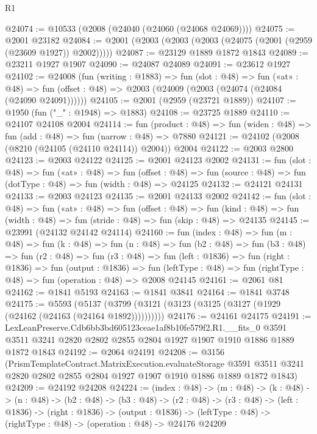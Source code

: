 \begin{lexlean}{R1}
\begin{coremodule}
@24074 := @10533 (@2008 (@24040 (@24060 (@24068 @24069))))
@24075 := @2001 @23182
@24084 := @2001 (@2003 (@2003 (@2003 (@24075 (@2001 (@2959 (@23609 @1927)) @2002)))))
@24087 := @23129 @1889 @1872 @1843
@24089 := @23211 @1927 @1907
@24090 := @24087 @24089
@24091 := @23612 @1927
@24102 := @24008
    (fun (writing : @1883) =>
    fun (slot : @48) =>
    fun («at» : @48) =>
    fun (offset : @48) => @2003 (@24009 (@2003 (@24074 (@24084 (@24090 @24091))))))
@24105 := @2001 (@2959 (@23721 @1889))
@24107 := @1950 (fun ("_" : @1948) => @1883)
@24108 := @23725 @1889
@24110 := @24107 @24108 @2004
@24114 := fun (product : @48) => fun (widen : @48) => fun (add : @48) => fun (narrow : @48) => @7880
@24121 := @24102 (@2008 (@8210 (@24105 (@24110 @24114)) @2004)) @2004
@24122 := @2003 @2800
@24123 := @2003 @24122
@24125 := @2001 @24123 @2002
@24131 := fun (slot : @48) =>
  fun («at» : @48) =>
  fun (offset : @48) => fun (source : @48) => fun (dotType : @48) => fun (width : @48) => @24125
@24132 := @24121 @24131
@24133 := @2003 @24123
@24135 := @2001 @24133 @2002
@24142 := fun (slot : @48) =>
  fun («at» : @48) =>
  fun (offset : @48) =>
  fun (kind : @48) => fun (width : @48) => fun (stride : @48) => fun (skip : @48) => @24135
@24145 := @23991 (@24132 @24142 @24114)
@24160 := fun (index : @48) =>
  fun (m : @48) =>
  fun (k : @48) =>
  fun (n : @48) =>
  fun (b2 : @48) =>
  fun (b3 : @48) =>
  fun (r2 : @48) =>
  fun (r3 : @48) =>
  fun (left : @1836) =>
  fun (right : @1836) =>
  fun (output : @1836) =>
  fun (leftType : @48) => fun (rightType : @48) => fun (operation : @48) => @2008 @24145
@24161 := @2061 @81
@24162 := @1841 @5193
@24163 := @1841 @3841
@24164 := @1841 @3748
@24175 := @5593
    (@5137 (@3799 (@3121 (@3123 (@3125 (@3127 (@1929 (@24162 (@24163 (@24164 @1892))))))))))
@24176 := @24161 @24175
@24191 := LexLeanPreserve.Cdb6bb3bd605123ceae1af8b10fe579f2.R1.__fits_0
    @3591
    @3511
    @3241
    @2820
    @2802
    @2855
    @2804
    @1927
    @1907
    @1910
    @1886
    @1889
    @1872
    @1843
@24192 := @2064 @24191
@24208 := @3156
    (PrismTemplateContract.MatrixExecution.evaluateStorage
      @3591
      @3511
      @3241
      @2820
      @2802
      @2855
      @2804
      @1927
      @1907
      @1910
      @1886
      @1889
      @1872
      @1843)
@24209 := @24192 @24208
@24224 := (index : @48) ->
  (m : @48) ->
  (k : @48) ->
  (n : @48) ->
  (b2 : @48) ->
  (b3 : @48) ->
  (r2 : @48) ->
  (r3 : @48) ->
  (left : @1836) ->
  (right : @1836) ->
  (output : @1836) -> (leftType : @48) -> (rightType : @48) -> (operation : @48) -> @24176 @24209

\end{coremodule}
\end{lexlean}
